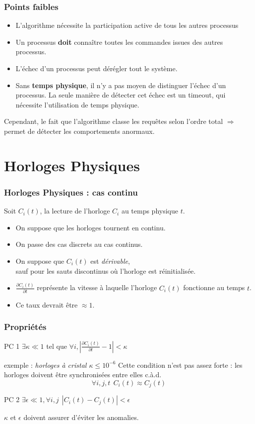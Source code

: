 \documentclass[compress]{beamer}
\begin{document}
\begin{frame}
\frametitle{Points faibles}
\begin{itemize}
\item L'algorithme nécessite la participation active de tous les autres processus
\item Un processus \textbf{doit} connaître toutes les commandes issues des autres processus. 
\item L'échec d'un processus peut dérégler tout le système.
\item Sans \textbf{\color{cyan} temps physique}, il n'y a pas moyen de distinguer l'échec d'un processus. La seule manière de détecter cet échec est un timeout, qui nécessite l'utilisation de temps physique.
\end{itemize}
Cependant, le fait que l'algorithme classe les requêtes selon l'ordre total $\Rightarrow$ permet de détecter les comportements anormaux.
\end{frame}


\section{Horloges Physiques}
\begin{frame}
\frametitle{Horloges Physiques : cas continu}
Soit $C_i(t)$, la lecture de l'horloge $C_i$ au temps physique $t$.
\begin{itemize}
\item On suppose que les horloges tournent en continu.
\item On passe des cas discrets au cas continus.
\item On suppose que $C_i(t)$ est \textit{dérivable},\\
	sauf pour les sauts discontinus où l'horloge est réinitialisée.
\item $\frac{\partial C_i(t)}{\partial t}$ représente la vitesse à laquelle l'horloge $C_i(t)$ fonctionne au temps $t$.
\item Ce taux devrait être $\approx 1$.
\end{itemize}
\end{frame}

\begin{frame}
\frametitle{Propriétés}
\begin{block}{PC 1}
$\exists \kappa \ll 1$ tel que $\forall i, |\frac{\partial C_i(t)}{\partial t} - 1| < \kappa$
\end{block}
exemple : \textit{horloges à cristal $\kappa \leq 10^{-6}$}
Cette condition n'est pas assez forte : les horloges doivent être synchronisées entre elles c.à.d.
\[\forall i, j, t \ \ C_i(t) \approx C_j(t)\]
\begin{block}{PC 2}
$\exists \epsilon \ll 1, \forall i, j \ \ |C_i(t) - C_j(t)| < \epsilon$
\end{block}
$\kappa$ et $\epsilon$ doivent assurer d'éviter les anomalies.\\
\end{frame}
\end{document}
